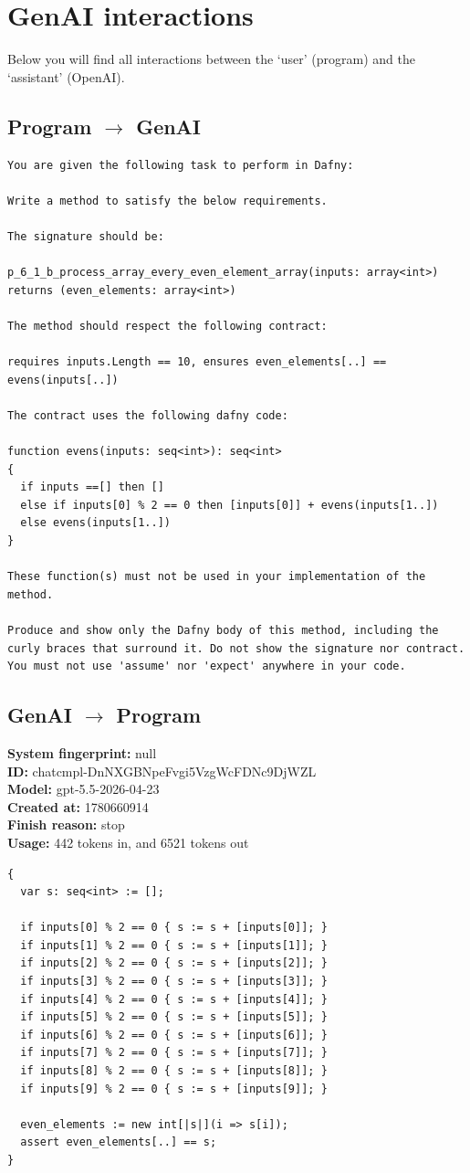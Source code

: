 \documentclass{article}
\begin{document}
\section*{GenAI interactions}
Below you will find all interactions between the `user' (program) and the `assistant' (OpenAI).
\subsection*{Program $\rightarrow$ GenAI}
\begin{lstlisting}
You are given the following task to perform in Dafny:

Write a method to satisfy the below requirements.

The signature should be:

p_6_1_b_process_array_every_even_element_array(inputs: array<int>) returns (even_elements: array<int>)

The method should respect the following contract:

requires inputs.Length == 10, ensures even_elements[..] == evens(inputs[..])

The contract uses the following dafny code:

function evens(inputs: seq<int>): seq<int>
{
  if inputs ==[] then []
  else if inputs[0] % 2 == 0 then [inputs[0]] + evens(inputs[1..])
  else evens(inputs[1..])
}

These function(s) must not be used in your implementation of the method.

Produce and show only the Dafny body of this method, including the curly braces that surround it. Do not show the signature nor contract. You must not use 'assume' nor 'expect' anywhere in your code.
\end{lstlisting}
\subsection*{GenAI $\rightarrow$ Program}
\textbf{System fingerprint: }null
\\\textbf{ID: }chatcmpl-DnNXGBNpeFvgi5VzgWcFDNc9DjWZL
\\\textbf{Model: }gpt-5.5-2026-04-23
\\\textbf{Created at: }1780660914
\\\textbf{Finish reason: }stop
\\\textbf{Usage: }442 tokens in, and 6521 tokens out
\begin{lstlisting}
{
  var s: seq<int> := [];

  if inputs[0] % 2 == 0 { s := s + [inputs[0]]; }
  if inputs[1] % 2 == 0 { s := s + [inputs[1]]; }
  if inputs[2] % 2 == 0 { s := s + [inputs[2]]; }
  if inputs[3] % 2 == 0 { s := s + [inputs[3]]; }
  if inputs[4] % 2 == 0 { s := s + [inputs[4]]; }
  if inputs[5] % 2 == 0 { s := s + [inputs[5]]; }
  if inputs[6] % 2 == 0 { s := s + [inputs[6]]; }
  if inputs[7] % 2 == 0 { s := s + [inputs[7]]; }
  if inputs[8] % 2 == 0 { s := s + [inputs[8]]; }
  if inputs[9] % 2 == 0 { s := s + [inputs[9]]; }

  even_elements := new int[|s|](i => s[i]);
  assert even_elements[..] == s;
}
\end{lstlisting}
\end{document}

